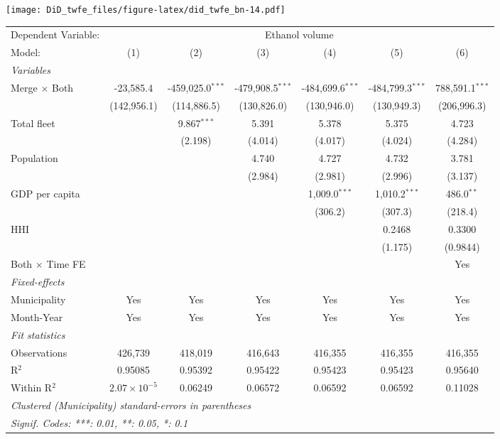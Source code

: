 \documentclass[
]{article}
\begin{document}
\texttt{[image: DiD\_twfe\_files/figure-latex/did\_twfe\_bn-14.pdf]}

\begin{tabular}{lcccccc}
\tabularnewline\midrule\midrule
Dependent Variable:&\multicolumn{6}{c}{Ethanol volume}\\
Model:&(1) & (2) & (3) & (4) & (5) & (6)\\
\midrule \emph{Variables}&   &   &   &   &   &  \\
Merge $\times $ Both & -23,585.4 & -459,025.0$^{***}$ & -479,908.5$^{***}$ & -484,699.6$^{***}$ & -484,799.3$^{***}$ & 788,591.1$^{***}$\\
  &(142,956.1) & (114,886.5) & (130,826.0) & (130,946.0) & (130,949.3) & (206,996.3)\\
Total fleet &    & 9.867$^{***}$ & 5.391 & 5.378 & 5.375 & 4.723\\
  &   & (2.198) & (4.014) & (4.017) & (4.024) & (4.284)\\
Population &    &    & 4.740 & 4.727 & 4.732 & 3.781\\
  &   &    & (2.984) & (2.981) & (2.996) & (3.137)\\
GDP per capita &    &    &    & 1,009.0$^{***}$ & 1,010.2$^{***}$ & 486.0$^{**}$\\
  &   &    &    & (306.2) & (307.3) & (218.4)\\
HHI &    &    &    &    & 0.2468 & 0.3300\\
  &   &    &    &    & (1.175) & (0.9844)\\
Both $\times$ Time FE &  &  &  &  &  & Yes\\
\midrule \emph{Fixed-effects}&   &   &   &   &   &  \\
Municipality & Yes & Yes & Yes & Yes & Yes & Yes\\
Month-Year & Yes & Yes & Yes & Yes & Yes & Yes\\
\midrule \emph{Fit statistics}&  & & & & & \\
Observations & 426,739&418,019&416,643&416,355&416,355&416,355\\
R$^2$ & 0.95085&0.95392&0.95422&0.95423&0.95423&0.95640\\
Within R$^2$ & $2.07\times 10^{-5}$&0.06249&0.06572&0.06592&0.06592&0.11028\\
\midrule\midrule\multicolumn{7}{l}{\emph{Clustered (Municipality) standard-errors in parentheses}}\\
\multicolumn{7}{l}{\emph{Signif. Codes: ***: 0.01, **: 0.05, *: 0.1}}\\
\end{tabular}
\end{document}
